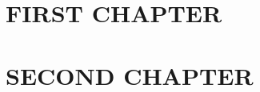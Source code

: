 \chapter{\uppercase{First Chapter} \label{chapter:01}}



\chapter{\uppercase{Second Chapter} \label{chapter:02}}


